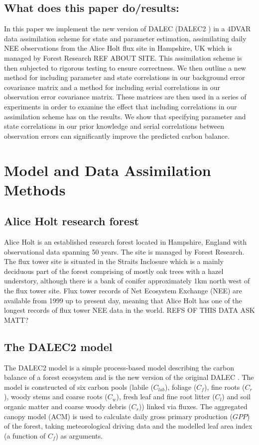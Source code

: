 \documentclass[11pt]{article}
\begin{document}
\subsection{What does this paper do/results:}
In this paper we implement the new version of DALEC (DALEC2 \citep{Bloom2015}) in a 4DVAR data assimilation scheme for state and parameter estimation, assimilating daily NEE observations from the Alice Holt flux site in Hampshire, UK which is managed by Forest Research REF ABOUT SITE. This assimilation scheme is then subjected to rigorous testing to ensure correctness. We then outline a new method for including parameter and state correlations in our background error covariance matrix and a method for including serial correlations in our observation error covariance matrix. These matrices are then used in a series of experiments in order to examine the effect that including correlations in our assimilation scheme has on the results. We show that specifying parameter and state correlations in our prior knowledge and serial correlations between observation errors can significantly improve the predicted carbon balance.

\section{Model and Data Assimilation Methods}

\subsection{Alice Holt research forest}

Alice Holt is an established research forest located in Hampshire, England with observational data spanning 50 years. The site is managed by Forest Research. The flux tower site is situated in the Straits Inclosure which is a mainly deciduous part of the forest comprising of mostly oak trees with a hazel understory, although there is a bank of conifer approximately 1km north west of the flux tower site. Flux tower records of Net Ecosystem Exchange (NEE) are available from 1999 up to present day, meaning that Alice Holt has one of the longest records of flux tower NEE data in the world. REFS OF THIS DATA ASK MATT?  

\subsection{The DALEC2 model}

The DALEC2 model is a simple process-based model describing the carbon balance of a forest ecosystem \citep{Bloom2015} and is the new version of the original DALEC \citep{williams2005improved}. The model is constructed of six carbon pools (labile ($C_{lab}$), foliage ($C_f$), fine roots ($C_r$), woody stems and coarse roots ($C_w$), fresh leaf and fine root litter ($C_l$) and soil organic matter and coarse woody debris ($C_s$)) linked via fluxes. The aggregated canopy model (ACM) \citep{williams1997predicting} is used to calculate daily gross primary production ($GPP$) of the forest, taking meteorological driving data and the modelled leaf area index (a function of $C_f$) as arguments.   
\end{document}
